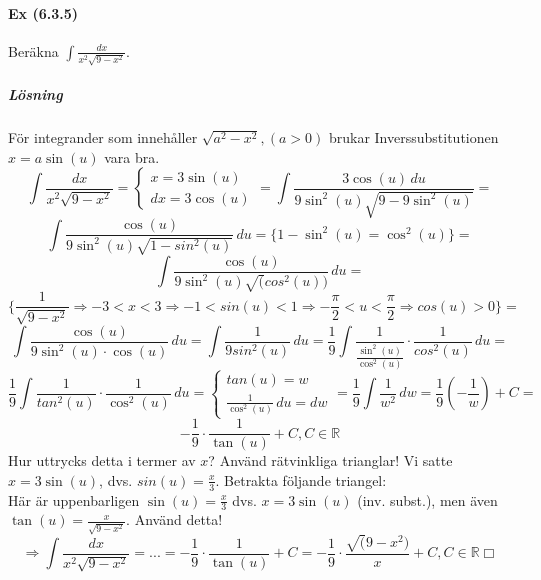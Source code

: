 \paragraph{Ex (6.3.5)} Beräkna $\int\frac{dx}{x^2\sqrt{9-x^2}}$.
\subparagraph{Lösning} För integrander som innehåller
$\sqrt{a^2-x^2}, (a>0)$ brukar Inverssubstitutionen $x=a\sin(u)$ vara bra.
\begin{equation*}
    \int\frac{dx}{x^2\sqrt{9-x^2}}=
    \left\lbrace
    \begin{matrix}
        x=3\sin(u) \\
        dx=3\cos(u)
    \end{matrix}
    \right.=
    \int\frac{3\cos(u)\, du}{9\sin^2(u)\sqrt{9-9\sin^2(u)}}=
\end{equation*}
\begin{equation*}
    \int\frac{\cos(u)}{9\sin^2(u)\sqrt{1-sin^2(u)}}\, du=
    \{1-\sin^2(u)=\cos^2(u)\}=
\end{equation*}
\begin{equation*}
    \int\frac{\cos(u)}{9\sin^2(u)\sqrt(cos^2(u))}\, du=
\end{equation*}
\begin{equation*}
    \{\frac{1}{\sqrt{9-x^2}}\Rightarrow
    -3<x<3\Rightarrow -1<sin(u)<1\Rightarrow
    -\frac{\pi}{2}<u<\frac{\pi}{2}\Rightarrow
    cos(u)>0\}=
\end{equation*}
\begin{equation*}
    \int\frac{\cos(u)}{9\sin^2(u)\cdot\cos(u)}\, du=
    \int\frac{1}{9sin^2(u)}\, du=
    \frac{1}{9}\int\frac{1}{\frac{\sin^2(u)}{\cos^2(u)}}\cdot\frac{1}{cos^2(u)}\, du=
\end{equation*}
\begin{equation*}
    \frac{1}{9}\int\frac{1}{tan^2(u)}\cdot\frac{1}{\cos^2(u)}\, du=
    \left\lbrace
    \begin{matrix}
        tan(u)=w \\
        \frac{1}{\cos^2(u)}\, du=dw
    \end{matrix}
    \right.=
    \frac{1}{9}\int\frac{1}{w^2}\, dw=
    \frac{1}{9}(-\frac{1}{w})+C=
\end{equation*}
\begin{equation*}
    -\frac{1}{9}\cdot\frac{1}{\tan(u)}+C, C\in\mathbb{R}
\end{equation*}
Hur uttrycks detta i termer av $x$?
Använd rätvinkliga trianglar!
Vi satte $x=3\sin(u)$, dvs. $sin(u)=\frac{x}{3}$.
Betrakta följande triangel:\\
Här är uppenbarligen $\sin(u)=\frac{x}{3}$ dvs. $x=3\sin(u)$ (inv. subst.),
men även $\tan(u)=\frac{x}{\sqrt{9-x^2}}$.
Använd detta!
\begin{equation*}
    \Rightarrow\int\frac{dx}{x^2\sqrt{9-x^2}}=...=
    -\frac{1}{9}\cdot\frac{1}{\tan(u)}+C=
    -\frac{1}{9}\cdot\frac{\sqrt(9-x^2)}{x}+C,C\in\mathbb{R} \Box
\end{equation*}